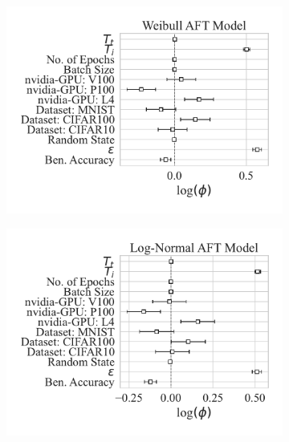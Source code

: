\documentclass[conference]{IEEEtran}
\begin{document}
\begin{figure}[h!]
    \centering
    \captionsetup[subfigure]{skip=0pt} %
    \begin{subfigure}{.3\textwidth}
        \includegraphics[width=\textwidth]{plots/combined/weibull_aft.pdf}
    \end{subfigure}
    \begin{subfigure}{.3\textwidth}
        \includegraphics[width=\textwidth]{plots/combined/log_normal_aft.pdf}
    \end{subfigure}
    \begin{subfigure}{.3\textwidth}

\end{subfigure}
\end{figure}
\end{document}
